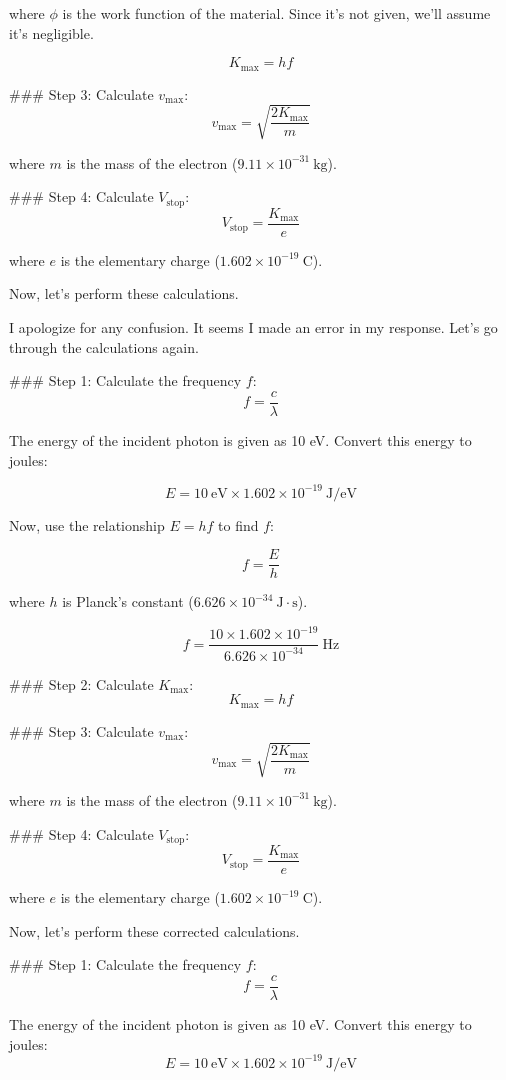 \documentclass[addpoints]{exam}
\begin{document}
\begin{questions}
\begin{parts}
\begin{solution}
where \( \phi \) is the work function of the material. Since it's not given, we'll assume it's negligible.

\[ K_{\text{max}} = hf \]

### Step 3: Calculate \( v_{\text{max}} \):
\[ v_{\text{max}} = \sqrt{\frac{2 K_{\text{max}}}{m}} \]

where \( m \) is the mass of the electron (\(9.11 \times 10^{-31} \ \text{kg}\)).

### Step 4: Calculate \( V_{\text{stop}} \):
\[ V_{\text{stop}} = \frac{K_{\text{max}}}{e} \]

where \( e \) is the elementary charge (\(1.602 \times 10^{-19} \ \text{C}\)).

Now, let's perform these calculations.

I apologize for any confusion. It seems I made an error in my response. Let's go through the calculations again.

### Step 1: Calculate the frequency \( f \):
\[ f = \frac{c}{\lambda} \]

The energy of the incident photon is given as 10 eV. Convert this energy to joules:

\[ E = 10 \ \text{eV} \times 1.602 \times 10^{-19} \ \text{J/eV} \]

Now, use the relationship \( E = hf \) to find \( f \):

\[ f = \frac{E}{h} \]

where \( h \) is Planck's constant (\(6.626 \times 10^{-34} \ \text{J}\cdot\text{s}\)).

\[ f = \frac{10 \times 1.602 \times 10^{-19}}{6.626 \times 10^{-34}} \ \text{Hz} \]

### Step 2: Calculate \( K_{\text{max}} \):
\[ K_{\text{max}} = hf \]

### Step 3: Calculate \( v_{\text{max}} \):
\[ v_{\text{max}} = \sqrt{\frac{2 K_{\text{max}}}{m}} \]

where \( m \) is the mass of the electron (\(9.11 \times 10^{-31} \ \text{kg}\)).

### Step 4: Calculate \( V_{\text{stop}} \):
\[ V_{\text{stop}} = \frac{K_{\text{max}}}{e} \]

where \( e \) is the elementary charge (\(1.602 \times 10^{-19} \ \text{C}\)).

Now, let's perform these corrected calculations.

### Step 1: Calculate the frequency \( f \):
\[ f = \frac{c}{\lambda} \]

The energy of the incident photon is given as 10 eV. Convert this energy to joules:
\[ E = 10 \ \text{eV} \times 1.602 \times 10^{-19} \ \text{J/eV} \]


\end{solution}
\end{parts}
\end{questions}
\end{document}
